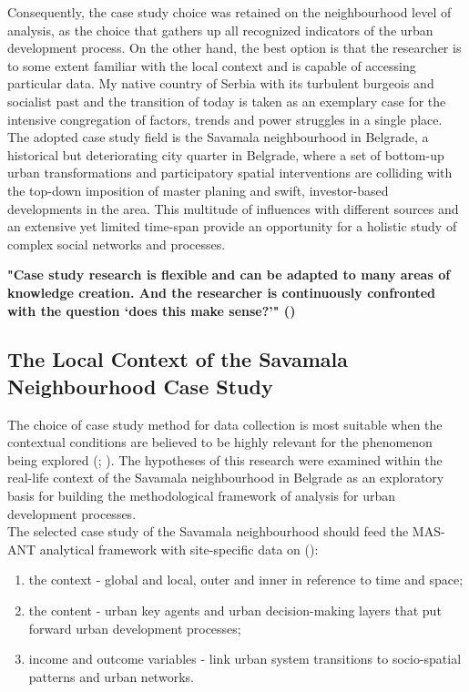 \documentclass[11pt]{report}
\begin{document}
{{{{Consequently, the case study choice was retained on the neighbourhood level of analysis, as the choice that gathers up all recognized indicators of the urban development process. On the other hand, the best option is that the researcher is to some extent familiar with the local context and is capable of accessing particular data. My native country of Serbia with its turbulent burgeois and socialist past and the transition of today is taken as an exemplary case for the intensive congregation of factors, trends and power struggles in a single place. The adopted case study field is the Savamala neighbourhood in Belgrade, a historical but deteriorating city quarter in Belgrade, where a set of bottom-up urban transformations and participatory spatial interventions are colliding with the top-down imposition of master planing and swift, investor-based developments in the area. This multitude of influences with different sources and an extensive yet limited time-span provide an opportunity for a holistic study of complex social networks and processes.

\textbf{"Case study research is flexible and can be adapted to many areas of knowledge creation. And the researcher is continuously confronted with the question ‘does this make sense?’" (\href{Harrison}{\citealt{partington_case_2002}})}

\subsection{The Local Context of the Savamala Neighbourhood Case Study}

The choice of case study method for data collection is most suitable when the  contextual  conditions  are  believed  to  be highly relevant for the phenomenon being explored (\href{Robson}{\citealt{robson_real_1993}}; \href{Yin}{\citealt{yin_case_2003}}). The hypotheses of this research were examined within the real-life context of the Savamala neighbourhood in Belgrade as an exploratory basis for building the methodological framework of analysis for urban development processes. 
\\

The selected case study of the Savamala neighbourhood should feed the MAS-ANT analytical framework with site-specific data on (\href{Harrison}{\citealt{partington_case_2002}}):
\begin{enumerate}
\item the context - global and local, outer and inner in reference to time and space;
\item the content - urban key agents and urban decision-making layers that put forward urban development processes;
\item income and outcome variables - link urban system transitions to socio-spatial patterns and urban networks.
\end{enumerate}

}}}}
\end{document}
